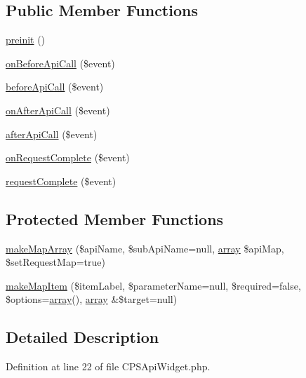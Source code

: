 \subsection*{Public Member Functions}
\begin{DoxyCompactItemize}
\item 
\hyperlink{classCPSApiWidget_a2dc262e99b1c246b56f27626bfe699ff}{preinit} ()
\item 
\hyperlink{classCPSApiWidget_a6366c3940c120c34aa6cf7f4cc4df2c8}{onBeforeApiCall} (\$event)
\item 
\hyperlink{classCPSApiWidget_a8d1ffc45e66988165bc31c6135830fd3}{beforeApiCall} (\$event)
\item 
\hyperlink{classCPSApiWidget_aababdbe8ed9e71593b4619ca5e7b57f3}{onAfterApiCall} (\$event)
\item 
\hyperlink{classCPSApiWidget_a5a5d728f3727da5e41589b0e72b0bd33}{afterApiCall} (\$event)
\item 
\hyperlink{classCPSApiWidget_aa82445f7b6bd99b5b837b1ee92b3d3bf}{onRequestComplete} (\$event)
\item 
\hyperlink{classCPSApiWidget_abcd54b473a65fd055b561cecc39d7737}{requestComplete} (\$event)
\end{DoxyCompactItemize}
\subsection*{Protected Member Functions}
\begin{DoxyCompactItemize}
\item 
\hyperlink{classCPSApiWidget_a144fe38756c5927205e8c750f8da768e}{makeMapArray} (\$apiName, \$subApiName=null, \hyperlink{list_8php_aa3205d038c7f8feb5c9f01ac4dfadc88}{array} \$apiMap, \$setRequestMap=true)
\item 
\hyperlink{classCPSApiWidget_a994fbc009e9ddb1dee7f559c53a12e7d}{makeMapItem} (\$itemLabel, \$parameterName=null, \$required=false, \$options=\hyperlink{list_8php_aa3205d038c7f8feb5c9f01ac4dfadc88}{array}(), \hyperlink{list_8php_aa3205d038c7f8feb5c9f01ac4dfadc88}{array} \&\$target=null)
\end{DoxyCompactItemize}


\subsection{Detailed Description}


Definition at line 22 of file CPSApiWidget.php.



